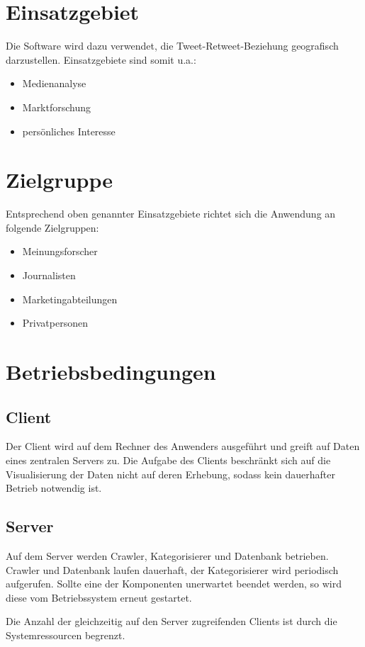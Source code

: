 \section{Einsatzgebiet}
Die Software wird dazu verwendet, die Tweet-Retweet-Beziehung geografisch darzustellen. Einsatzgebiete sind somit u.a.:
\begin{itemize}
	\item Medienanalyse
	\item Marktforschung
	\item persönliches Interesse
\end{itemize}
\section{Zielgruppe}
Entsprechend oben genannter Einsatzgebiete richtet sich die Anwendung an folgende Zielgruppen:
\begin{itemize}
	\item Meinungsforscher
	\item Journalisten
	\item Marketingabteilungen
	\item Privatpersonen
\end{itemize}
\section{Betriebsbedingungen}
\subsection{Client}
Der Client wird auf dem Rechner des Anwenders ausgeführt und greift auf Daten eines zentralen Servers zu. Die Aufgabe des Clients beschränkt sich auf die Visualisierung der Daten nicht auf deren Erhebung, sodass kein dauerhafter Betrieb notwendig ist.
	 
\subsection{Server}

Auf dem Server werden Crawler, Kategorisierer und Datenbank betrieben. Crawler und Datenbank laufen dauerhaft, der Kategorisierer wird periodisch aufgerufen.
Sollte eine der Komponenten unerwartet beendet werden, so wird diese vom Betriebssystem erneut gestartet. 

Die Anzahl der gleichzeitig auf den Server zugreifenden Clients ist durch die Systemressourcen begrenzt.	 

